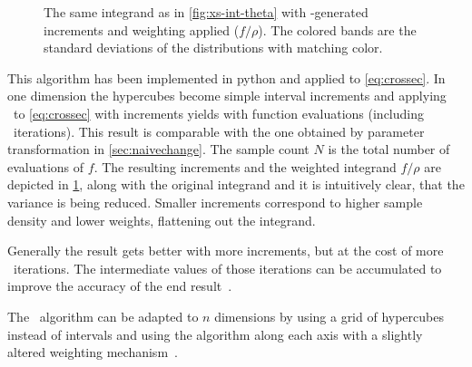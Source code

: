 \begin{figure}[ht]
  \centering {}
  \caption[\(2\pi\dv{\sigma}{\theta}\) scaled to increments found by
  \vegas\ ]{\label{fig:xs-int-vegas} The same integrand as in
    \cref{fig:xs-int-theta} with \vegas-generated increments and
    weighting applied (\(f/\rho\)). The colored bands are the standard
    deviations of the distributions with matching color.}
\end{figure}
%
This algorithm has been implemented in python and applied to
\cref{eq:crossec}.  In one dimension the hypercubes become simple
interval increments and applying \vegas\ to \cref{eq:crossec} with
 increments yields
 with
 function evaluations (including
\vegas\ iterations). This result is comparable with the one obtained
by parameter transformation in \cref{sec:naivechange}.  The sample
count \(N\) is the total number of evaluations of \(f\). The resulting
increments and the weighted integrand \(f/\rho\) are depicted in
\cref{fig:xs-int-vegas}, along with the original integrand and it is
intuitively clear, that the variance is being reduced. Smaller
increments correspond to higher sample density and lower weights,
flattening out the integrand.

Generally the result gets better with more increments, but at the cost
of more \vegas\ iterations. The intermediate values of those
iterations can be accumulated to improve the accuracy of the end
result~\cite[197]{Lepage:19781an}.

The \vegas\ algorithm can be adapted to \(n\) dimensions by using a
grid of hypercubes instead of intervals and using the algorithm along
each axis with a slightly altered weighting
mechanism~\cite[197]{Lepage:19781an}.

